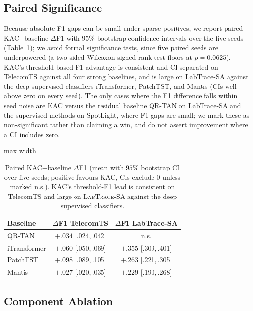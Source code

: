 \documentclass[conference]{IEEEtran}
\begin{document}
\subsection{Paired Significance}
\label{sec:significance}

Because absolute F1 gaps can be small under sparse positives, we report paired KAC$-$baseline $\Delta$F1 with $95\%$ bootstrap confidence intervals over the five seeds (Table~\ref{tab:significance}); we avoid formal significance tests, since five paired seeds are underpowered (a two-sided Wilcoxon signed-rank test floors at $p{=}0.0625$). KAC's threshold-based F1 advantage is consistent and CI-separated on TelecomTS against all four strong baselines, and is large on LabTrace-SA against the deep supervised classifiers iTransformer, PatchTST, and Mantis (CIs well above zero on every seed). The only cases where the F1 difference falls within seed noise are KAC versus the residual baseline QR-TAN on LabTrace-SA and the supervised methods on SpotLight, where F1 gaps are small; we mark these as non-significant rather than claiming a win, and do not assert improvement where a CI includes zero.

\begin{table}[t]
  \centering
  \caption{Paired KAC$-$baseline $\Delta$F1 (mean with $95\%$ bootstrap CI over five seeds; positive favours KAC, CIs exclude $0$ unless marked n.s.). KAC's threshold-F1 lead is consistent on TelecomTS and large on \textsc{LabTrace-SA} against the deep supervised classifiers.}
  \label{tab:significance}
  \small
  \setlength{\tabcolsep}{3pt}
  \begin{adjustbox}{max width=\columnwidth}
  \begin{tabular}{@{}lcc@{}}
    \toprule
    \textbf{Baseline} & \textbf{$\Delta$F1 TelecomTS} & \textbf{$\Delta$F1 LabTrace-SA} \\
    \midrule
    QR-TAN       & $+.034$ [.024,\,.042] & n.s. \\
    iTransformer & $+.060$ [.050,\,.069] & $+.355$ [.309,\,.401] \\
    PatchTST     & $+.098$ [.089,\,.105] & $+.263$ [.221,\,.305] \\
    Mantis       & $+.027$ [.020,\,.035] & $+.229$ [.190,\,.268] \\
    \bottomrule
  \end{tabular}
  \end{adjustbox}
\end{table}

\subsection{Component Ablation}
\label{sec:ablation}
\end{document}
